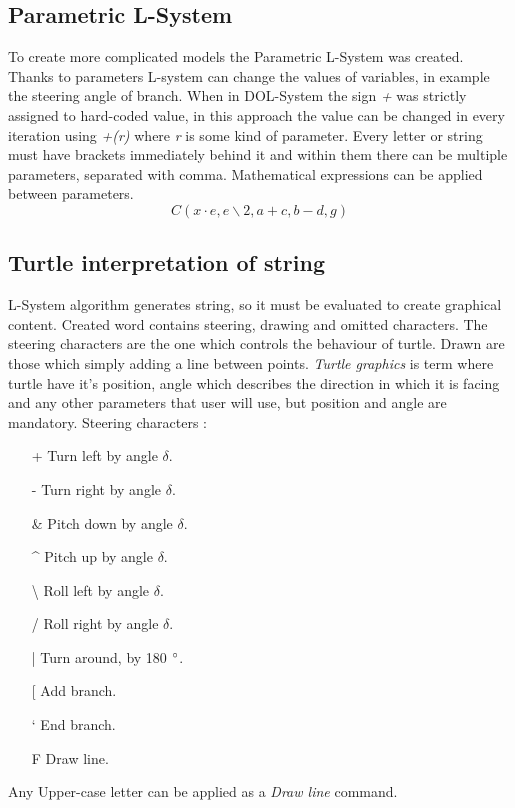 \documentclass[b5paper,twoside,11pt]{article}
\begin{document}
\subsection{Parametric L-System}
To create more complicated models the Parametric L-System was created. Thanks to parameters L-system can change the values of variables, in example the steering angle of branch. When in DOL-System the sign \textit{+} was strictly assigned to hard-coded value, in this approach the value can be changed in every iteration using \textit{+(r)} where \textit{r} is some kind of parameter. Every letter or string must have brackets immediately behind it and within them there can be multiple parameters, separated with comma. Mathematical expressions can be applied between parameters.
\begin{equation*}
C(x\cdot e,e\backslash 2,a+c,b-d,g)
\end{equation*}
\subsection{Turtle interpretation of string}
L-System algorithm generates string, so it must be evaluated to create graphical content. Created word contains steering, drawing and omitted characters. The steering characters are the one which controls the behaviour of turtle. Drawn are those which simply adding a line between points.
\textit{Turtle graphics} is term where turtle have it's position, angle which describes the direction in which it is facing and any other parameters that user will use, but position and angle are mandatory.
Steering characters :
  \begin{itemize}  %
\item[+] Turn  left  by  angle $\delta$.
\item[-] Turn right by angle  $\delta$.
\item[\&] Pitch down by angle  $\delta$.
\item[\string^] Pitch up by angle  $\delta$.
\item[\textbackslash] Roll left by angle  $\delta$.
\item[/] Roll right by angle  $\delta$.
\item[\string|] Turn around, by 180 $\degree $.
\item[[] Add branch.
\item[\char`\]] End branch.
\item[F] Draw line.
\end{itemize}	
Any Upper-case letter can be applied as a \textit{Draw line} command.
\end{document}
